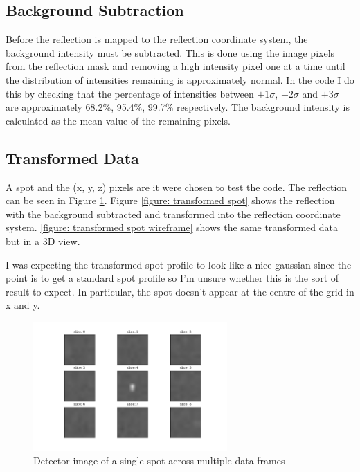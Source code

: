 \documentclass[a4paper,10pt]{article}
\begin{document}
\subsection{Background Subtraction}

Before the reflection is mapped to the reflection coordinate system, the 
background intensity must be subtracted. This is done using the image pixels
from the reflection mask and removing a high intensity pixel one at a time until
the distribution of intensities remaining is approximately normal. In the code
I do this by checking that the percentage of intensities between 
$\pm 1 \sigma$, $\pm 2 \sigma$ and $\pm 3 \sigma$ are approximately 68.2\%, 
95.4\%, 99.7\% respectively. The background intensity is calculated as the 
mean value of the remaining pixels.

\subsection{Transformed Data}

A spot and the (x, y, z) pixels are it were chosen to test the code. The 
reflection can be seen in Figure \ref{figure: detector spot}. Figure 
\ref{figure: transformed spot} shows the reflection with the background 
subtracted and transformed into the reflection coordinate system. 
\ref{figure: transformed spot wireframe} shows the same transformed data but in
a 3D view.

I was expecting the transformed spot profile to look like a nice gaussian since
the point is to get a standard spot profile so I'm unsure whether this is the 
sort of result to expect. In particular, the spot doesn't appear at the centre
of the grid in x and y.

\begin{figure}
  \centering
  \includegraphics[width=0.66\textwidth]{./Figures/simple_spot_slices.png}
  \caption{Detector image of a single spot across multiple data frames}
  \label{figure: detector spot}
\end{figure}
\end{document}
